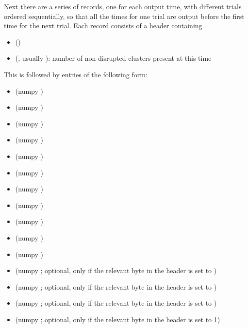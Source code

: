 \documentclass[letterpaper,10pt,english]{sphinxmanual}
\begin{document}
Next there are a series of records, one for each output time, with
different trials ordered sequentially, so that all the times for one
trial are output before the first time for the next trial. Each record
consists of a header containing
\begin{itemize}
\item {} 
 ()

\item {} 
 (, usually ): number of non-disrupted clusters present at this time

\end{itemize}

This is followed by  entries of the following form:
\begin{itemize}
\item {} 
 (numpy )

\item {} 
 (numpy )

\item {} 
 (numpy )

\item {} 
 (numpy )

\item {} 
 (numpy )

\item {} 
 (numpy )

\item {} 
 (numpy )

\item {} 
 (numpy )

\item {} 
 (numpy )

\item {} 
 (numpy )

\item {} 
 (numpy )

\item {} 
 (numpy ; optional, only if the relevant byte
in the header is set to )

\item {} 
 (numpy ; optional, only if the relevant byte
in the header is set to )

\item {} 
 (numpy ; optional, only if the relevant byte
in the header is set to )

\item {} 
 (numpy ; optional, only if the relevant byte
in the header is set to 1)

\end{itemize}
\end{document}
